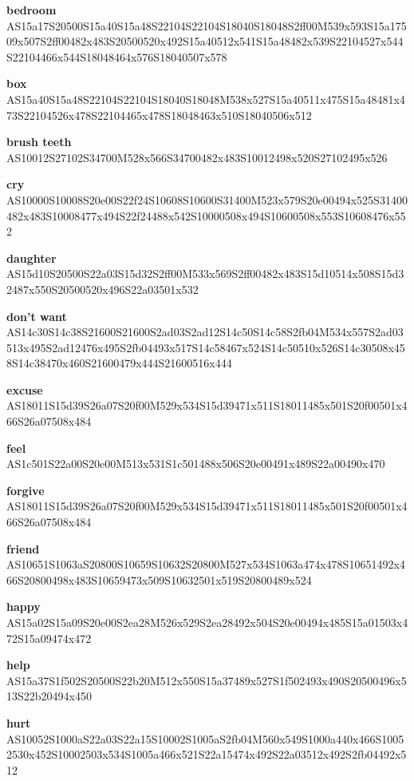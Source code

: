 \documentclass{article}
\begin{document}
\begin{glossary}
\textbf{bedroom}\\
AS15a17S20500S15a40S15a48S22104S22104S18040S18048S2ff00M539x593S15a17509x507S2ff00482x483S20500520x492S15a40512x541S15a48482x539S22104527x544S22104466x544S18048464x576S18040507x578

\textbf{box}\\
AS15a40S15a48S22104S22104S18040S18048M538x527S15a40511x475S15a48481x473S22104526x478S22104465x478S18048463x510S18040506x512

\textbf{brush teeth}\\
AS10012S27102S34700M528x566S34700482x483S10012498x520S27102495x526

\textbf{cry}\\
AS10000S10008S20e00S22f24S10608S10600S31400M523x579S20e00494x525S31400482x483S10008477x494S22f24488x542S10000508x494S10600508x553S10608476x552

\textbf{daughter}\\
AS15d10S20500S22a03S15d32S2ff00M533x569S2ff00482x483S15d10514x508S15d32487x550S20500520x496S22a03501x532

\textbf{don't want}\\
AS14c30S14c38S21600S21600S2ad03S2ad12S14c50S14c58S2fb04M534x557S2ad03513x495S2ad12476x495S2fb04493x517S14c58467x524S14c50510x526S14c30508x458S14c38470x460S21600479x444S21600516x444

\textbf{excuse}\\
AS18011S15d39S26a07S20f00M529x534S15d39471x511S18011485x501S20f00501x466S26a07508x484

\textbf{feel}\\
AS1c501S22a00S20e00M513x531S1c501488x506S20e00491x489S22a00490x470

\textbf{forgive}\\
AS18011S15d39S26a07S20f00M529x534S15d39471x511S18011485x501S20f00501x466S26a07508x484

\textbf{friend}\\
AS10651S1063aS20800S10659S10632S20800M527x534S1063a474x478S10651492x466S20800498x483S10659473x509S10632501x519S20800489x524

\textbf{happy}\\
AS15a02S15a09S20e00S2ea28M526x529S2ea28492x504S20e00494x485S15a01503x472S15a09474x472

\textbf{help}\\
AS15a37S1f502S20500S22b20M512x550S15a37489x527S1f502493x490S20500496x513S22b20494x450

\textbf{hurt}\\
AS10052S1000aS22a03S22a15S10002S1005aS2fb04M560x549S1000a440x466S10052530x452S10002503x534S1005a466x521S22a15474x492S22a03512x492S2fb04492x512


\end{glossary}
\end{document}
